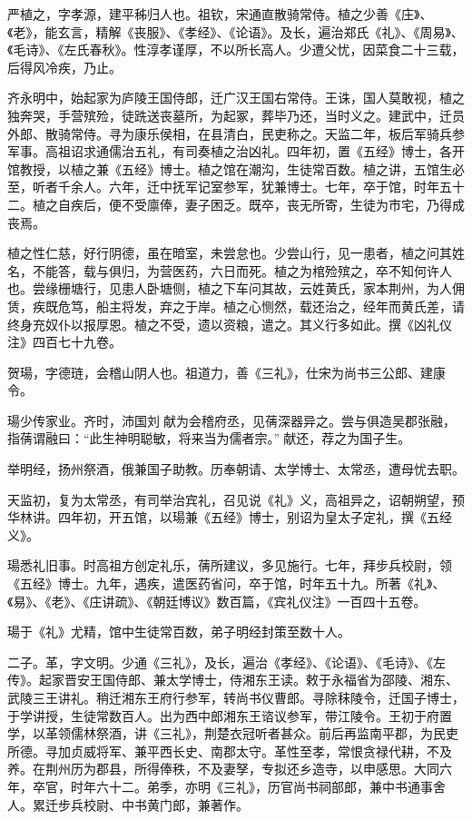 \documentclass[12pt,UTF8]{ctexbook}
\begin{document}
严植之，字孝源，建平秭归人也。祖钦，宋通直散骑常侍。植之少善《庄》、《老》，能玄言，精解《丧服》、《孝经》、《论语》。及长，遍治郑氏《礼》、《周易》、《毛诗》、《左氏春秋》。性淳孝谨厚，不以所长高人。少遭父忧，因菜食二十三载，后得风冷疾，乃止。

齐永明中，始起家为庐陵王国侍郎，迁广汉王国右常侍。王诛，国人莫敢视，植之独奔哭，手营殡殓，徒跣送丧墓所，为起冢，葬毕乃还，当时义之。建武中，迁员外郎、散骑常侍。寻为康乐侯相，在县清白，民吏称之。天监二年，板后军骑兵参军事。高祖诏求通儒治五礼，有司奏植之治凶礼。四年初，置《五经》博士，各开馆教授，以植之兼《五经》博士。植之馆在潮沟，生徒常百数。植之讲，五馆生必至，听者千余人。六年，迁中抚军记室参军，犹兼博士。七年，卒于馆，时年五十二。植之自疾后，便不受廪俸，妻子困乏。既卒，丧无所寄，生徒为市宅，乃得成丧焉。

植之性仁慈，好行阴德，虽在暗室，未尝怠也。少尝山行，见一患者，植之问其姓名，不能答，载与俱归，为营医药，六日而死。植之为棺殓殡之，卒不知何许人也。尝缘栅塘行，见患人卧塘侧，植之下车问其故，云姓黄氏，家本荆州，为人佣赁，疾既危笃，船主将发，弃之于岸。植之心恻然，载还治之，经年而黄氏差，请终身充奴仆以报厚恩。植之不受，遗以资粮，遣之。其义行多如此。撰《凶礼仪注》四百七十九卷。

贺瑒，字德琏，会稽山阴人也。祖道力，善《三礼》，仕宋为尚书三公郎、建康令。

瑒少传家业。齐时，沛国刘献为会稽府丞，见蒨深器异之。尝与俱造吴郡张融，指蒨谓融曰：“此生神明聪敏，将来当为儒者宗。”献还，荐之为国子生。

举明经，扬州祭酒，俄兼国子助教。历奉朝请、太学博士、太常丞，遭母忧去职。

天监初，复为太常丞，有司举治宾礼，召见说《礼》义，高祖异之，诏朝朔望，预华林讲。四年初，开五馆，以瑒兼《五经》博士，别诏为皇太子定礼，撰《五经义》。

瑒悉礼旧事。时高祖方创定礼乐，蒨所建议，多见施行。七年，拜步兵校尉，领《五经》博士。九年，遇疾，遣医药省问，卒于馆，时年五十九。所著《礼》、《易》、《老》、《庄讲疏》、《朝廷博议》数百篇，《宾礼仪注》一百四十五卷。

瑒于《礼》尤精，馆中生徒常百数，弟子明经封策至数十人。

二子。革，字文明。少通《三礼》，及长，遍治《孝经》、《论语》、《毛诗》、《左传》。起家晋安王国侍郎、兼太学博士，侍湘东王读。敕于永福省为邵陵、湘东、武陵三王讲礼。稍迁湘东王府行参军，转尚书仪曹郎。寻除秣陵令，迁国子博士，于学讲授，生徒常数百人。出为西中郎湘东王谘议参军，带江陵令。王初于府置学，以革领儒林祭酒，讲《三礼》，荆楚衣冠听者甚众。前后再监南平郡，为民吏所德。寻加贞威将军、兼平西长史、南郡太守。革性至孝，常恨贪禄代耕，不及养。在荆州历为郡县，所得俸秩，不及妻孥，专拟还乡造寺，以申感思。大同六年，卒官，时年六十二。弟季，亦明《三礼》，历官尚书祠部郎，兼中书通事舍人。累迁步兵校尉、中书黄门郎，兼著作。
\end{document}
